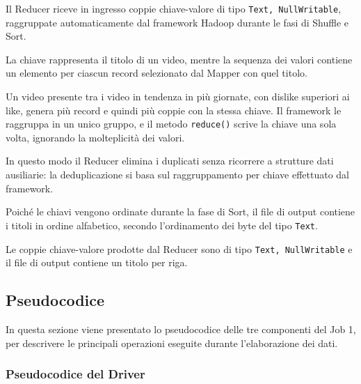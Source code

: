 \documentclass[12pt, a4paper]{article}
\begin{document}
Il Reducer riceve in ingresso coppie chiave-valore
di tipo \texttt{Text, NullWritable}, raggruppate
automaticamente dal framework Hadoop durante le
fasi di Shuffle e Sort.

La chiave rappresenta il titolo di un video, mentre
la sequenza dei valori contiene un elemento per ciascun
record selezionato dal Mapper con quel titolo.

Un video presente tra i video in tendenza in più
giornate, con dislike superiori ai like, genera
più record e quindi più coppie con la stessa chiave.
Il framework le raggruppa in un unico gruppo,
e il metodo \texttt{reduce()} scrive la chiave
una sola volta, ignorando la molteplicità dei valori.

In questo modo il Reducer elimina i duplicati
senza ricorrere a strutture dati ausiliarie:
la deduplicazione si basa sul raggruppamento
per chiave effettuato dal framework.

Poiché le chiavi vengono ordinate durante la fase
di Sort, il file di output contiene i titoli
in ordine alfabetico, secondo l'ordinamento
dei byte del tipo \texttt{Text}.

Le coppie chiave-valore prodotte dal Reducer
sono di tipo \texttt{Text, NullWritable} e il file
di output contiene un titolo per riga.

\subsection{Pseudocodice}

In questa sezione viene presentato lo pseudocodice
delle tre componenti del Job 1, per descrivere
le principali operazioni eseguite durante
l'elaborazione dei dati.

\subsubsection{Pseudocodice del Driver}
\end{document}
